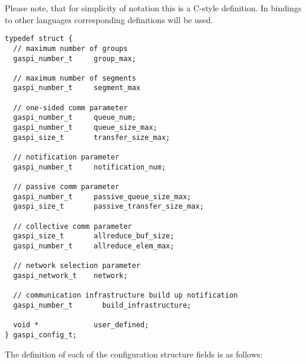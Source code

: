 \documentclass[a4paper]{article}
\makeatletter
\newlength{\st}\setlength{\st}{0pt}
\newcounter{counttodo}
\newlength{\savetabcolsep}
\newlength{\savearrayrulewidth}
\newenvironment{todo}
{\stepcounter{counttodo}
 \typeout{Environment TODO call \thecounttodo}
 \setlength{\savetabcolsep}{\tabcolsep}
 \setlength{\savearrayrulewidth}{\arrayrulewidth}
 \renewcommand{\tabcolsep}{0pt}
 \renewcommand{\arrayrulewidth}{2pt}
 \begin{center}
 \begin{tabular}{c|l@{\hspace*{2em}}|@{\hspace*{2em}}c}
 &
 \begin{minipage}{0.66\textwidth}
 \begin{itemize}
}
{\end{itemize}
 \end{minipage}
 &  todo \#\thecounttodo
 \end{tabular} \marginpar{$\Longleftarrow$}
 \end{center}
 \renewcommand{\tabcolsep}{\savetabcolsep}
 \renewcommand{\arrayrulewidth}{\savearrayrulewidth}
}
\makeatother
\begin{document}
Please note, that for simplicity of notation this is a C-style
definition. In bindings to other languages corresponding definitions
will be used.


\begin{lstlisting}[caption=GASPI configuration structure.]
typedef struct {
  // maximum number of groups
  gaspi_number_t     group_max;

  // maximum number of segments
  gaspi_number_t     segment_max

  // one-sided comm parameter
  gaspi_number_t     queue_num;
  gaspi_number_t     queue_size_max;
  gaspi_size_t       transfer_size_max;

  // notification parameter
  gaspi_number_t     notification_num;

  // passive comm parameter
  gaspi_number_t     passive_queue_size_max;
  gaspi_size_t       passive_transfer_size_max;

  // collective comm parameter
  gaspi_size_t       allreduce_buf_size;
  gaspi_number_t     allreduce_elem_max;

  // network selection parameter
  gaspi_network_t    network;

  // communication infrastructure build up notification
  gaspi_number_t       build_infrastructure;

  void *             user_defined;
} gaspi_config_t;
\end{lstlisting}

The definition of each of the configuration structure fields is as follows:
\end{document}

